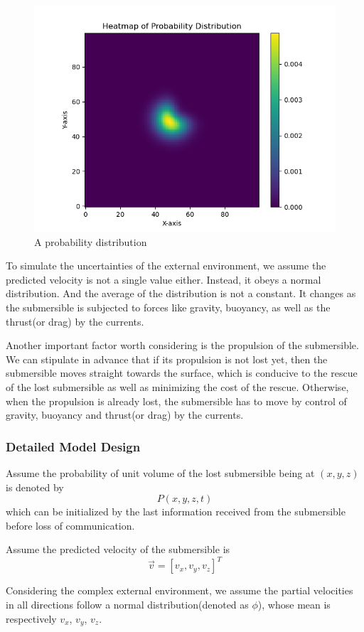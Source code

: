 \documentclass[12pt]{article}
\begin{document}
\begin{figure}[H]
\centering
\includegraphics[width=.9\textwidth]{heatmap.png}
\caption{A probability distribution}
\label{fig:heatmap}
\end{figure}

To simulate the uncertainties of the external environment, we assume the predicted velocity is not a single value either. Instead, it obeys a normal distribution. And the average of the distribution is not a constant. It changes as the submersible is subjected to forces like gravity, buoyancy, as well as the thrust(or drag) by the currents.

Another important factor worth considering is the propulsion of the submersible. We can stipulate in advance that if its propulsion is not lost yet, then the submersible moves straight towards the surface, which is conducive to the rescue of the lost submersible as well as minimizing the cost of the rescue. Otherwise, when the propulsion is already lost, the submersible has to move by control of gravity, buoyancy and thrust(or drag) by the currents.
\subsubsection{Detailed Model Design}
Assume the probability of unit volume of the lost submersible being at $(x,y,z)$ is denoted by
$$P(x,y,z,t)$$
which can be initialized by the last information received from the submersible before loss of communication.

Assume the predicted velocity of the submersible is
$$\vec{v}=[v_{x},v_{y},v_{z}]^{T}$$

Considering the complex external environment, we assume the partial velocities in all directions follow a normal distribution(denoted as $\phi$), whose mean is respectively $v_{x}$, $v_{y}$, $v_{z}$.
\end{document}
